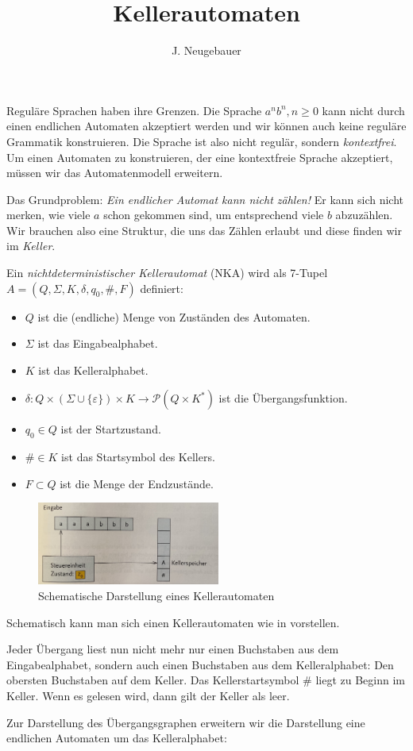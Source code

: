 \documentclass[10pt, a4paper]{scrartcl}
\author{J. Neugebauer}
\title{Kellerautomaten}
\date{\Heute}
\begin{document}
\ReiheTitel

Reguläre Sprachen haben ihre Grenzen. Die Sprache $a^nb^n, n\geq 0$ kann nicht durch einen endlichen Automaten akzeptiert werden und wir können auch keine reguläre Grammatik konstruieren. Die Sprache ist also nicht regulär, sondern \emph{kontextfrei}. Um einen Automaten zu konstruieren, der eine kontextfreie Sprache akzeptiert, müssen wir das Automatenmodell erweitern. 

Das Grundproblem: \emph{Ein endlicher Automat kann nicht zählen!} Er kann sich nicht merken, wie viele $a$ schon gekommen sind, um entsprechend viele $b$ abzuzählen. Wir brauchen also eine Struktur, die uns das Zählen erlaubt und diese finden wir im \emph{Keller}.

\begin{infobox}
Ein \emph{nichtdeterministischer Kellerautomat} (NKA) wird als 7-Tupel $A = (Q, \Sigma, K, \delta, q_0, \#, F)$ definiert:
\begin{itemize}
	\item $Q$ ist die (endliche) Menge von Zuständen des Automaten.
	\item $\Sigma$ ist das Eingabealphabet.
	\item $K$ ist das Kelleralphabet.
	\item $\delta: Q\times (\Sigma\cup \{\varepsilon\}) \times K\rightarrow \mathcal P(Q \times K^{*})$ ist die Übergangsfunktion.
	\item $q_0\in Q$ ist der Startzustand.
	\item $\#\in K$ ist das Startsymbol des Kellers.
	\item $F\subset Q$ ist die Menge der Endzustände.
\end{itemize}
\end{infobox}

\begin{wrapfig}
\begin{figure}
	\centering
	\includegraphics[width=6cm]{Q1-LK-AB.08-Kellerautomaten.jpeg}
	\caption{Schematische Darstellung eines Kellerautomaten}
	\label{abb:schema_nka}
\end{figure}
Schematisch kann man sich einen Kellerautomaten wie in  vorstellen.

Jeder Übergang liest nun nicht mehr nur einen Buchstaben aus dem Eingabealphabet, sondern auch einen Buchstaben aus dem Kelleralphabet: Den obersten Buchstaben auf dem Keller. Das Kellerstartsymbol $\#$ liegt zu Beginn im Keller. Wenn es gelesen wird, dann gilt der Keller als leer.

Zur Darstellung des Übergangsgraphen erweitern wir die Darstellung eine endlichen Automaten um das Kelleralphabet:
\end{wrapfig}
\end{document}
